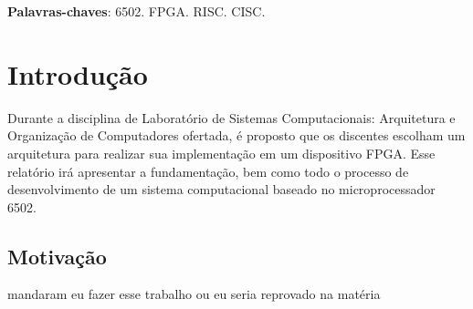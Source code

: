 \documentclass[
	12pt,				  %
	openright,		%
	a4paper,			%
	english,			%
	french,				%
	spanish,			%
	brazil,				%
]{abntex2}
\begin{document}

\frenchspacing


\imprimircapa

\imprimirfolhaderosto*

\setlength{\absparsep}{18pt} %
\begin{resumo}


	\noindent
	\textbf{Palavras-chaves}: 6502. FPGA. RISC. CISC.
\end{resumo}



\listoffigures*
\clearpage

\listoftables*
\clearpage


\printglossary[type=\acronymtype, title=Lista de Abreviações]
\clearpage

\tableofcontents*


\textual

\chapter{Introdução}
Durante a disciplina de Laboratório de Sistemas Computacionais:
Arquitetura e Organização de Computadores ofertada, é proposto que os discentes
escolham um arquitetura para realizar sua implementação em um dispositivo FPGA.
Esse relatório irá apresentar a fundamentação, bem como todo o processo de
desenvolvimento de um sistema computacional baseado no microprocessador 6502.


\section{Motivação}
mandaram eu fazer esse trabalho ou eu seria reprovado na matéria
\end{document}
